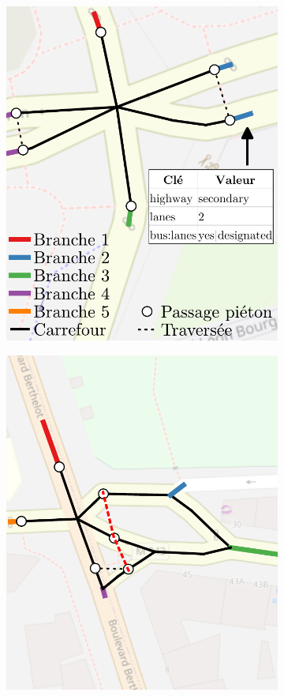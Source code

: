 \begin{figure}[ht]
\begin{subfigure}[t]{.3\linewidth}
        \includegraphics[width=\linewidth]{images/evaluation/crmodel/eval_cas2.pdf}
        \caption{}
    \end{subfigure}
    \begin{subfigure}[t]{.3\linewidth}
        \centering
        \includegraphics[width=\linewidth]{images/evaluation/crmodel/eval_cas3.pdf}

\end{subfigure}
\end{figure}
